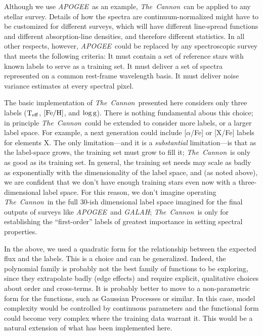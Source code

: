 \documentclass[12pt, preprint]{aastex}
\newcommand{\teff}{\mbox{$\rm T_{eff}$}}
\newcommand{\feh}{\mbox{$\rm [Fe/H]$}}
\newcommand{\logg}{\mbox{$\rm \log g$}}
\newcommand{\tc}{\textsl{The~Cannon}}
\newcommand{\apogee}{\textsl{APOGEE}}
\newcommand{\galah}{\textsl{GALAH}}
\begin{document}

 
Although we use \apogee\ as an example, \tc\ can be applied to
any stellar survey.
Details of how the spectra are continuum-normalized might have to be
customized for different surveys, which will have different
line-spread functions and different absorption-line densities, and
therefore different statistics.
In all other respects, however, \apogee\ could be replaced by any spectroscopic
survey that meets the following criteria:
It must contain a set of reference stars with known labels to serve as
a training set.
It must deliver a set of spectra represented on a common rest-frame
wavelength basis.
It must deliver noise variance estimates at every spectral pixel.



The basic implementation of \tc\ presented here considers only three
labels (\teff, \feh, and \logg).
There is nothing fundamental abous this choice; in principle
\tc\ could be extended to consider more labels, or a larger
label space.
For example, a next generation could include [$\alpha$/Fe] or [X/Fe]
labels for elements X.
The only limitation---and it is a \emph{substantial} limitation---is
that as the label-space grows, the training set must grow to fill it;
\tc\ is only as good as its training set.
In general, the training set needs may scale as badly as exponentially
with the dimensionality of the label space, and (as noted above), we
are confident that we don't have enough training stars even now with
a three-dimensional label space.
For this reason, we don't imagine operating \tc\ in the full 30-ish
dimensional label space imagined for the final outputs of surveys like
\apogee\ and \galah; \tc\ is only for establishing the ``first-order'' labels of
greatest importance in setting spectral properties.


In the above, we used a quadratic form for the
relationship between the expected flux and the labels.
This is a choice and can be generalized.
Indeed, the polynomial family is probably not the best family of
functions to be exploring, since they extrapolate badly (edge effects)
and require explicit, qualitative choices about order and cross-terms.
It is probably better to move to a non-parametric form for the functions,
such as Gaussian Processes or similar.
In this case, model complexity would be controlled by continuous
parameters and the functional form could become very complex where the
training data warrant it.
This would be a natural extension of what has been implemented here.
\end{document}
